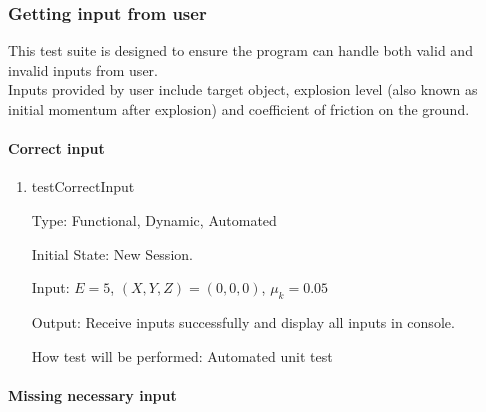 \documentclass[12pt, titlepage]{article}
\begin{document}
\subsubsection{Getting input from user}
\label{Sec_TestInput}

This test suite is designed to ensure the program can handle both valid and invalid inputs from user.\\ 
Inputs provided by user include target object, explosion level (also known as initial momentum after explosion) and coefficient of friction on the ground. 
		
\paragraph{Correct input}

\begin{enumerate}

\item{testCorrectInput\\}

Type: Functional, Dynamic, Automated

Initial State: New Session.

Input: $E = 5$, $(X,Y,Z) = (0,0,0)$, $\mu_{k} = 0.05$  

Output: Receive inputs successfully and display all inputs in console.

How test will be performed: Automated unit test 

\end{enumerate}

\paragraph{Missing necessary input}
\end{document}
